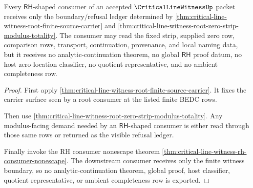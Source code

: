 \begin{theorem}
\label{thm:critical-line-witness-root-rh-refusal-ledger}
Every $\mathsf{RH}$-shaped consumer of an accepted $\CriticalLineWitnessUp$ packet receives only the boundary/refusal ledger determined by \autoref{thm:critical-line-witness-root-finite-source-carrier} and \autoref{thm:critical-line-witness-root-zero-strip-modulus-totality}. The consumer may read the fixed strip, supplied zero row, comparison rows, transport, continuation, provenance, and local naming data, but it receives no analytic-continuation theorem, no global $\mathsf{RH}$ proof datum, no host zero-location classifier, no quotient representative, and no ambient completeness row.
\end{theorem}
\begin{proof}
First apply \autoref{thm:critical-line-witness-root-finite-source-carrier}. It fixes the carrier surface seen by a root consumer at the listed finite BEDC rows.

Then use \autoref{thm:critical-line-witness-root-zero-strip-modulus-totality}. Any modulus-facing demand needed by an $\mathsf{RH}$-shaped consumer is either read through those same rows or returned as the visible refusal ledger.

Finally invoke the RH consumer nonescape theorem \autoref{thm:critical-line-witness-rh-consumer-nonescape}. The downstream consumer receives only the finite witness boundary, so no analytic-continuation theorem, global proof, host classifier, quotient representative, or ambient completeness row is exported.
\end{proof}
